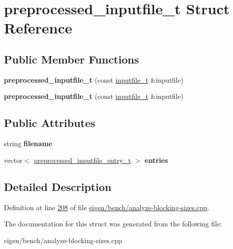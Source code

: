 \hypertarget{structpreprocessed__inputfile__t}{}\section{preprocessed\+\_\+inputfile\+\_\+t Struct Reference}
\label{structpreprocessed__inputfile__t}
\subsection*{Public Member Functions}
\begin{DoxyCompactItemize}
\item 
\mbox{\label{structpreprocessed__inputfile__t_a637cb374b9c9d7910effa6ac381ea708}} 
{\bfseries preprocessed\+\_\+inputfile\+\_\+t} (const \hyperlink{structinputfile__t}{inputfile\+\_\+t} \&inputfile)
\item 
\mbox{\label{structpreprocessed__inputfile__t_a637cb374b9c9d7910effa6ac381ea708}} 
{\bfseries preprocessed\+\_\+inputfile\+\_\+t} (const \hyperlink{structinputfile__t}{inputfile\+\_\+t} \&inputfile)
\end{DoxyCompactItemize}
\subsection*{Public Attributes}
\begin{DoxyCompactItemize}
\item 
\mbox{\label{structpreprocessed__inputfile__t_ac289273e02969f67a216b77587e1bc44}} 
string {\bfseries filename}
\item 
\mbox{\label{structpreprocessed__inputfile__t_a1d9084fa4945efc915123887fe654c36}} 
vector$<$ \hyperlink{structpreprocessed__inputfile__entry__t}{preprocessed\+\_\+inputfile\+\_\+entry\+\_\+t} $>$ {\bfseries entries}
\end{DoxyCompactItemize}


\subsection{Detailed Description}


Definition at line \hyperlink{eigen_2bench_2analyze-blocking-sizes_8cpp_source_l00208}{208} of file \hyperlink{eigen_2bench_2analyze-blocking-sizes_8cpp_source}{eigen/bench/analyze-\/blocking-\/sizes.\+cpp}.



The documentation for this struct was generated from the following file\+:\begin{DoxyCompactItemize}
\item 
eigen/bench/analyze-\/blocking-\/sizes.\+cpp\end{DoxyCompactItemize}

